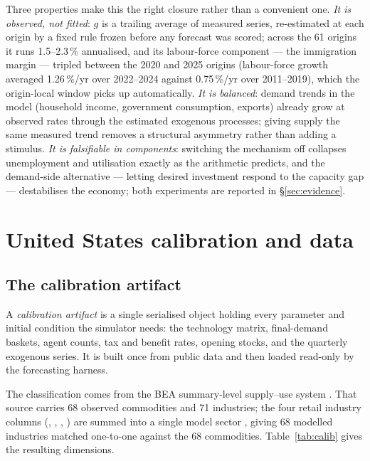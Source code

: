 \documentclass[11pt,a4paper]{article}
\newcommand{\code}[1]{\texttt{\detokenize{#1}}}
\begin{document}
Three properties make this the right closure rather than a convenient one. \emph{It is observed,
not fitted}: $g$ is a trailing average of measured series, re-estimated at each origin by a fixed
rule frozen before any forecast was scored; across the 61 origins it runs 1.5--2.3\,\% annualised,
and its labour-force component --- the immigration margin --- tripled between the 2020 and 2025
origins (labour-force growth averaged 1.26\,\%/yr over 2022--2024 against 0.75\,\%/yr over
2011--2019), which the origin-local window picks up automatically. \emph{It is balanced}: demand
trends in the model (household income, government consumption, exports) already grow at observed
rates through the estimated exogenous processes; giving supply the same measured trend removes a
structural asymmetry rather than adding a stimulus. \emph{It is falsifiable in components}:
switching the mechanism off collapses unemployment and utilisation exactly as the arithmetic
predicts, and the demand-side alternative --- letting desired investment respond to the capacity
gap --- destabilises the economy; both experiments are reported in \S\ref{sec:evidence}.

\section{United States calibration and data}
\label{sec:calib}

\subsection{The calibration artifact}

A \emph{calibration artifact} is a single serialised object holding every parameter and initial
condition the simulator needs: the technology matrix, final-demand baskets, agent counts, tax and
benefit rates, opening stocks, and the quarterly exogenous series. It is built once from public
data and then loaded read-only by the forecasting harness.

The classification comes from the BEA summary-level supply--use system \citep{bea_io}. That source
carries 68 observed commodities and 71 industries; the four retail industry columns
(\code{441}, \code{445}, \code{452}, \code{4A0}) are summed into a single model sector \code{4A0},
giving 68 modelled industries matched one-to-one against the 68 commodities. Table~\ref{tab:calib}
gives the resulting dimensions.
\end{document}
